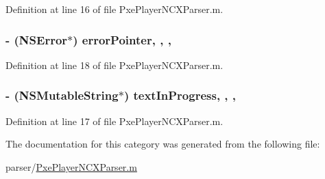 Definition at line 16 of file Pxe\-Player\-N\-C\-X\-Parser.\-m.

\hypertarget{category_pxe_player_n_c_x_parser_07_08_ae221014bdbff608ceaa2aac656803f16}{
\subsubsection[{error\-Pointer}]{\setlength{\rightskip}{0pt plus 5cm}-\/ (N\-S\-Error$\ast$) error\-Pointer\hspace{0.3cm}{\ttfamily [read]}, {\ttfamily [write]}, {\ttfamily [nonatomic]}, {\ttfamily [strong]}}}\label{category_pxe_player_n_c_x_parser_07_08_ae221014bdbff608ceaa2aac656803f16}


Definition at line 18 of file Pxe\-Player\-N\-C\-X\-Parser.\-m.

\hypertarget{category_pxe_player_n_c_x_parser_07_08_ad2b39744edeb133445e8ad99068d8bd7}{
\subsubsection[{text\-In\-Progress}]{\setlength{\rightskip}{0pt plus 5cm}-\/ (N\-S\-Mutable\-String$\ast$) text\-In\-Progress\hspace{0.3cm}{\ttfamily [read]}, {\ttfamily [write]}, {\ttfamily [nonatomic]}, {\ttfamily [strong]}}}\label{category_pxe_player_n_c_x_parser_07_08_ad2b39744edeb133445e8ad99068d8bd7}


Definition at line 17 of file Pxe\-Player\-N\-C\-X\-Parser.\-m.



The documentation for this category was generated from the following file\-:\begin{DoxyCompactItemize}
\item 
parser/\hyperlink{_pxe_player_n_c_x_parser_8m}{Pxe\-Player\-N\-C\-X\-Parser.\-m}\end{DoxyCompactItemize}

